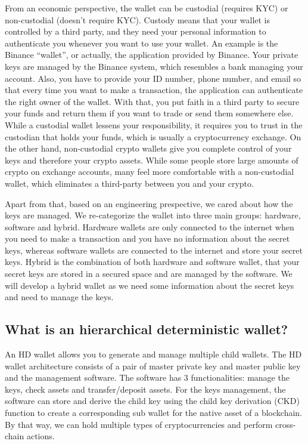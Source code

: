 From an economic perspective, the wallet can be custodial (requires KYC) or non-custodial (doesn’t require KYC). Custody means that your wallet is controlled by a third party, and they need your personal information to authenticate you whenever you want to use your wallet. An example is the Binance ``wallet”, or actually, the application provided by Binance. Your private keys are managed by the Binance system, which resembles a bank managing your account. Also, you have to provide your ID number, phone number, and email so that every time you want to make a transaction, the application can authenticate the right owner of the wallet. With that, you put faith in a third party to secure your funds and return them if you want to trade or send them somewhere else. While a custodial wallet lessens your responsibility, it requires you to trust in the custodian that holds your funds, which is usually a cryptocurrency exchange. On the other hand, non-custodial crypto wallets give you complete control of your keys and therefore your crypto assets. While some people store large amounts of crypto on exchange accounts, many feel more comfortable with a non-custodial wallet, which eliminates a third-party between you and your crypto.

Apart from that, based on an engineering prespective, we cared about how the keys are managed. We re-categorize the wallet into three main groups: hardware, software and hybrid. Hardware wallets are only connected to the internet when you need to make a transaction and you have no information about the secret keys, whereas software wallets are connected to the internet and store your secret keys. Hybrid is the combination of both hardware and software wallet, that your secret keys are stored in a secured space and are managed by the software. We will develop a hybrid wallet as we need some information about the secret keys and need to manage the keys.

\subsection{What is an hierarchical deterministic wallet?}

An HD wallet allows you to generate and manage multiple child wallets. The HD wallet architecture consists of a pair of master private key and master public key and the management software. The software has 3 functionalities: manage the keys, check assets and transfer/deposit assets. For the keys management, the software can store and derive the child key using the child key derivation (CKD) function to create a corresponding sub wallet for the native asset of a blockchain. By that way, we can hold multiple types of cryptocurrencies and perform cross-chain actions.

